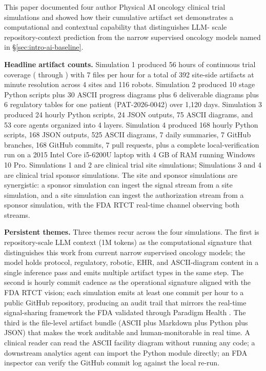 
This paper documented four author Physical AI oncology clinical trial
simulations and showed how their cumulative artifact set demonstrates
a computational and contextual capability that distinguishes LLM-
scale repository-context prediction from the narrow supervised
oncology models named in \S\ref{sec:intro-ai-baseline}.

\textbf{Headline artifact counts.} Simulation 1 produced 56 hours of
continuous trial coverage ( through )
with 7 files per hour for a total of 392 site-side artifacts at
minute resolution across 4 sites and 116 robots. Simulation 2
produced 10 stage Python scripts plus 30 ASCII progress diagrams plus
6 deliverable diagrams plus 6 regulatory tables for one patient
(PAT-2026-0042) over 1,120 days. Simulation 3 produced 24 hourly
Python scripts, 24 JSON outputs, 75 ASCII diagrams, and 53 core
agents organized into 4 layers. Simulation 4 produced 168 hourly
Python scripts, 168 JSON outputs, 525 ASCII diagrams, 7 daily
summaries, 7 GitHub branches, 168 GitHub commits, 7 pull requests,
plus a complete local-verification run on a 2015 Intel Core i5-6200U
laptop with 4 GB of RAM running Windows 10 Pro. Simulations 1 and 2
are clinical trial site simulations; Simulations 3 and 4 are clinical
trial sponsor simulations. The site and sponsor simulations are
synergistic: a sponsor simulation can ingest the signal stream from a
site simulation, and a site simulation can ingest the authorization
stream from a sponsor simulation, with the FDA RTCT real-time channel
observing both streams.

\textbf{Persistent themes.} Three themes recur across the four
simulations. The first is repository-scale LLM context (1M tokens) as
the computational signature that distinguishes this work from current
narrow supervised oncology models; the model holds protocol,
regulatory, robotic, EHR, and ASCII-diagram content in a single
inference pass and emits multiple artifact types in the same step.
The second is hourly commit cadence as the operational signature
aligned with the FDA RTCT vision; each simulation emits at least one
commit per hour to a public GitHub repository, producing an audit
trail that mirrors the real-time signal-sharing framework the FDA
validated through Paradigm Health \cite{fda2026realtime}. The third
is the file-level artifact bundle (ASCII plus Markdown plus Python
plus JSON) that makes the work auditable and human-monitorable in
real time. A clinical reader can read the ASCII facility diagram
without running any code; a downstream analytics agent can import
the Python module directly; an FDA inspector can verify the GitHub
commit log against the local re-run.

